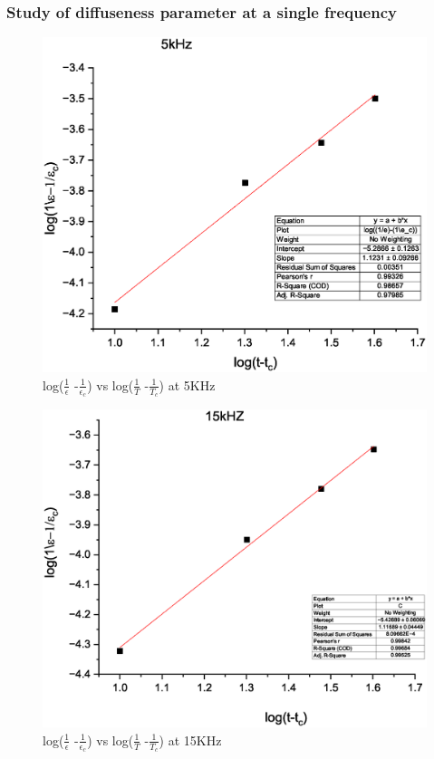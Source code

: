 		\subsubsection{Study of diffuseness parameter at a single frequency}
			
			\begin{figure}[H]
				\centering
				\label{graph:6}
				\includegraphics[width=0.8\columnwidth]{images/g6.eps}
				\caption{log($\frac{1}{\epsilon}$ -$\frac{1}{\epsilon_c}$) vs log($\frac{1}{T}$ -$\frac{1}{T_c}$)  at 5KHz}
			\end{figure}
			\begin{figure}[H]
				\centering
				\label{graph:7}
				\includegraphics[width=0.8\columnwidth]{images/g7.eps}
				\caption{log($\frac{1}{\epsilon}$ -$\frac{1}{\epsilon_c}$) vs log($\frac{1}{T}$ -$\frac{1}{T_c}$)  at 15KHz}
			\end{figure}
